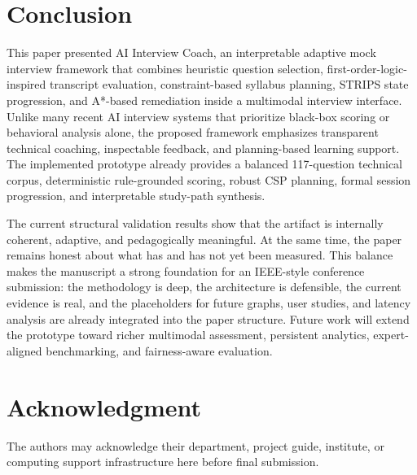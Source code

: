 \documentclass[conference]{IEEEtran}
\begin{document}
\section{Conclusion}
This paper presented AI Interview Coach, an interpretable adaptive mock interview framework that combines heuristic question selection, first-order-logic-inspired transcript evaluation, constraint-based syllabus planning, STRIPS state progression, and A*-based remediation inside a multimodal interview interface. Unlike many recent AI interview systems that prioritize black-box scoring or behavioral analysis alone, the proposed framework emphasizes transparent technical coaching, inspectable feedback, and planning-based learning support. The implemented prototype already provides a balanced 117-question technical corpus, deterministic rule-grounded scoring, robust CSP planning, formal session progression, and interpretable study-path synthesis.

The current structural validation results show that the artifact is internally coherent, adaptive, and pedagogically meaningful. At the same time, the paper remains honest about what has and has not yet been measured. This balance makes the manuscript a strong foundation for an IEEE-style conference submission: the methodology is deep, the architecture is defensible, the current evidence is real, and the placeholders for future graphs, user studies, and latency analysis are already integrated into the paper structure. Future work will extend the prototype toward richer multimodal assessment, persistent analytics, expert-aligned benchmarking, and fairness-aware evaluation.

\section*{Acknowledgment}
The authors may acknowledge their department, project guide, institute, or computing support infrastructure here before final submission.
\end{document}
